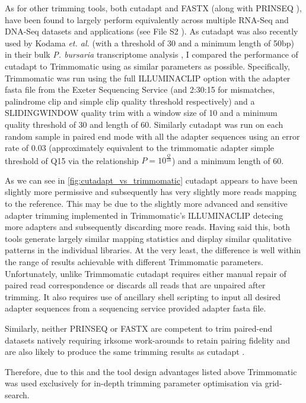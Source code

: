 As for other trimming tools, both cutadapt and FASTX (along with PRINSEQ \citep{Schmieder2011}), 
have been found to largely perform equivalently across multiple RNA-Seq and DNA-Seq datasets and applications 
(see File S2 \citep{DelFabbro2013}).
As cutadapt was also recently used by Kodama \textit{et. al.} (with a threshold of 30 and a minimum length of 50bp) 
in their bulk \textit{P. bursaria} transcriptome analysis \citep{Kodama2014}, I compared the performance
of cutadapt to Trimmomatic using as similar parameters as possible. Specifically, Trimmomatic
was run using the full ILLUMINACLIP option with the adapter fasta file from the Exeter 
Sequencing Service (and 2:30:15 for mismatches, palindrome clip and simple clip quality threshold respectively)
and a SLIDINGWINDOW quality trim with a window size of 10 and a minimum quality threshold of 30 and length of 60.
Similarly cutadapt was run on each random sample in paired end mode with all the adapter sequences using
an error rate of 0.03 (approximately equivalent to the trimmomatic adapter simple threshold of Q15 
via the relationship \(P=10^{\frac{Q}{10}}\)) and a minimum length of 60.

As we can see in \ref{fig:cutadapt_vs_trimmomatic} cutadapt appears to have been slightly more permissive
and subsequently has very slightly more reads mapping to the reference.  This may be due to the slightly
more advanced and sensitive adapter trimming implemented in Trimmomatic's ILLUMINACLIP detecing more 
adapters and subsequently discarding more reads.  Having said this, both tools generate largely similar
mapping statistics and display similar qualitative patterns in the individual libraries. 
At the very least, the difference is well within the range of results achievable with different
Trimmomatic parameters.  Unfortunately, unlike Trimmomatic cutadapt requires either manual repair of 
paired read correspondence or discards all reads that are unpaired after trimming. It also requires
use of ancillary shell scripting to input all desired adapter sequences from a sequencing service
provided adapter fasta file.

Similarly, neither PRINSEQ or FASTX are competent to trim paired-end datasets natively requiring
irksome work-arounds to retain pairing fidelity and are also likely to produce the same trimming 
results as cutadapt \citep{DelFabbro2013}. 

Therefore, due to this and the tool design advantages listed above Trimmomatic was used exclusively for 
in-depth trimming parameter optimisation via grid-search.



